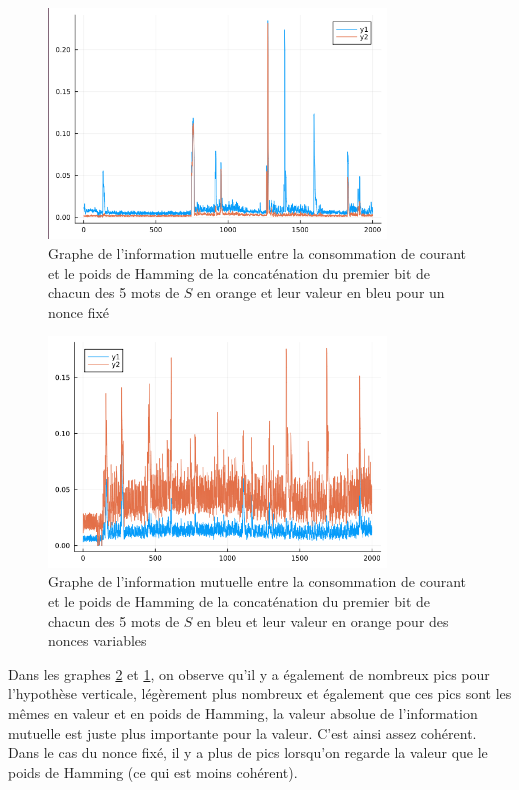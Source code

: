 \documentclass[12pt]{article}
\begin{document}
	\begin{figure}[H]
		\centering
		\includegraphics[width=0.8\textwidth]{vertical_one_bit}
		\caption{Graphe de l'information mutuelle entre la consommation de courant et le poids de Hamming de la concaténation du premier bit de chacun des 5 mots de $S$ en orange et leur valeur en bleu pour un nonce fixé}
		\label{vHW}
	\end{figure}
	
	\begin{figure}[H]
		\centering
		\includegraphics[width=0.8\textwidth]{vertical_one_byte}
		\caption{Graphe de l'information mutuelle entre la consommation de courant et le poids de Hamming de la concaténation du premier bit de chacun des 5 mots de $S$ en bleu et leur valeur en orange pour des nonces variables}
		\label{vHW&val}
	\end{figure}
	
	Dans les graphes \ref{vHW&val} et \ref{vHW}, on observe qu'il y a également de nombreux pics pour l'hypothèse verticale, légèrement plus nombreux et également que ces pics sont les mêmes en valeur et en poids de Hamming, la valeur absolue de l'information mutuelle est juste plus importante pour la valeur. C'est ainsi assez cohérent. Dans le cas du nonce fixé, il y a plus de pics lorsqu'on regarde la valeur que le poids de Hamming (ce qui est moins cohérent).
	
\end{document}

